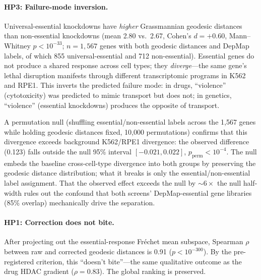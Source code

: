 \documentclass{article}
\begin{document}
\paragraph{HP3: Failure-mode inversion.}
Universal-essential knockdowns have \emph{higher} Grassmannian geodesic
distances than non-essential knockdowns (mean 2.80 vs.\ 2.67, Cohen's $d =
+0.60$, Mann--Whitney $p < 10^{-33}$; $n = 1{,}567$ genes with both
geodesic distances and DepMap labels, of which 855 universal-essential and
712 non-essential). Essential genes do not produce a shared response across
cell types; they \emph{diverge}---the same gene's lethal disruption
manifests through different transcriptomic programs in K562 and RPE1. This
inverts the predicted failure mode: in drugs, ``violence'' (cytotoxicity) was
predicted to mimic transport but does not; in genetics, ``violence''
(essential knockdowns) produces the opposite of transport.

A permutation null (shuffling essential/non-essential labels across the
1{,}567 genes while holding geodesic distances fixed, 10{,}000 permutations)
confirms that this divergence exceeds background K562/RPE1 divergence:
the observed difference (0.123) falls outside the null 95\% interval
$[-0.021, 0.022]$, $p_{\text{perm}} < 10^{-4}$. The null embeds the baseline
cross-cell-type divergence into both groups by preserving the geodesic
distance distribution; what it breaks is only the essential/non-essential
label assignment. That the observed effect exceeds the null by ${\sim}6\times$
the null half-width rules out the confound that both screens' DepMap-essential
gene libraries (85\% overlap) mechanically drive the separation.

\paragraph{HP1: Correction does not bite.}
After projecting out the essential-response Fr\'echet mean subspace,
Spearman $\rho$ between raw and corrected geodesic distances is 0.91 ($p <
10^{-300}$). By the pre-registered criterion, this ``doesn't bite''---the
same qualitative outcome as the drug HDAC gradient ($\rho = 0.83$).
The global ranking is preserved.
\end{document}
